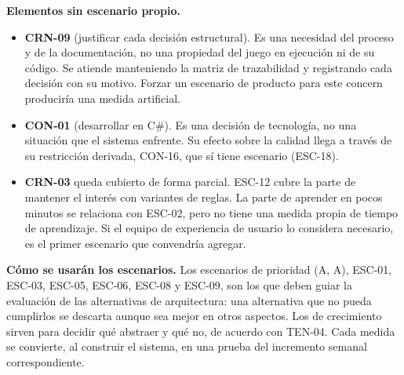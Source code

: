 \textbf{Elementos sin escenario propio.}

\begin{itemize}
  \item \textbf{CRN-09} (justificar cada decisión estructural). Es una necesidad del proceso y de la documentación, no una propiedad del juego en ejecución ni de su código. Se atiende manteniendo la matriz de trazabilidad y registrando cada decisión con su motivo. Forzar un escenario de producto para este concern produciría una medida artificial.
  \item \textbf{CON-01} (desarrollar en C\#). Es una decisión de tecnología, no una situación que el sistema enfrente. Su efecto sobre la calidad llega a través de su restricción derivada, CON-16, que sí tiene escenario (ESC-18).
  \item \textbf{CRN-03} queda cubierto de forma parcial. ESC-12 cubre la parte de mantener el interés con variantes de reglas. La parte de aprender en pocos minutos se relaciona con ESC-02, pero no tiene una medida propia de tiempo de aprendizaje. Si el equipo de experiencia de usuario lo considera necesario, es el primer escenario que convendría agregar.
\end{itemize}

\textbf{Cómo se usarán los escenarios.} Los escenarios de prioridad (A, A), ESC-01, ESC-03, ESC-05, ESC-06, ESC-08 y ESC-09, son los que deben guiar la evaluación de las alternativas de arquitectura: una alternativa que no pueda cumplirlos se descarta aunque sea mejor en otros aspectos. Los de crecimiento sirven para decidir qué abstraer y qué no, de acuerdo con TEN-04. Cada medida se convierte, al construir el sistema, en una prueba del incremento semanal correspondiente.
